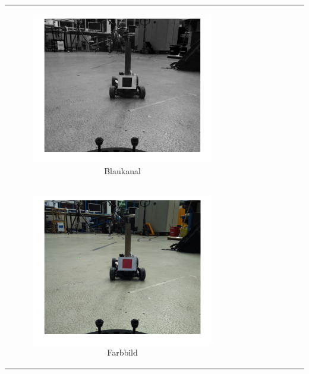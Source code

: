 \begin{center}
\begin{table}[ht]
\begin{tabular}{c c c}
\begin{subfigure}{0.3\textwidth}
\includegraphics[scale=0.08]{Figures/blaukanal.png} \vspace{-3.5mm}\caption{Blaukanal}
\end{subfigure}\\ 
\begin{subfigure}{0.3\textwidth}\centering

\includegraphics[scale=0.08]{Figures/rechteckbild.png} \vspace{-3.5mm}\caption{Farbbild}
\end{subfigure}&\begin{subfigure}{0.3\textwidth}\centering


\end{subfigure}
\end{tabular}
\end{table}
\end{center}
